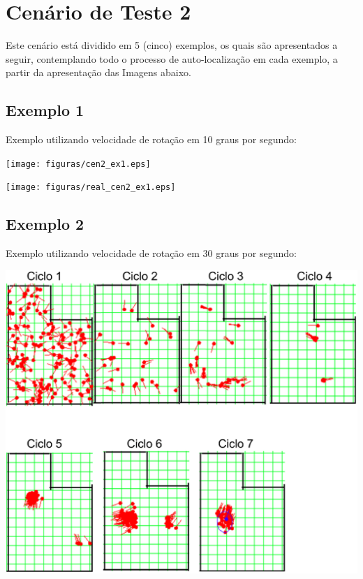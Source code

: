 \section{Cenário de Teste 2}

Este cenário está dividido em 5 (cinco) exemplos, os quais são apresentados a seguir, contemplando todo o processo de auto-localização
em cada exemplo, a partir da apresentação das Imagens abaixo.

\subsection{Exemplo 1}

Exemplo utilizando velocidade de rotação em 10 graus por segundo:

{\centering
\texttt{[image: figuras/cen2\_ex1.eps]}
\label{img:cen2_ex1}
\par}

{\centering
\texttt{[image: figuras/real\_cen2\_ex1.eps]}
\label{img:real_cen2_ex1}
\par}

\subsection{Exemplo 2}

Exemplo utilizando velocidade de rotação em 30 graus por segundo:

{\centering
\includegraphics[scale=0.4]{figuras/cen2_ex2.eps}
\label{img:cen2_ex2}
\par}

